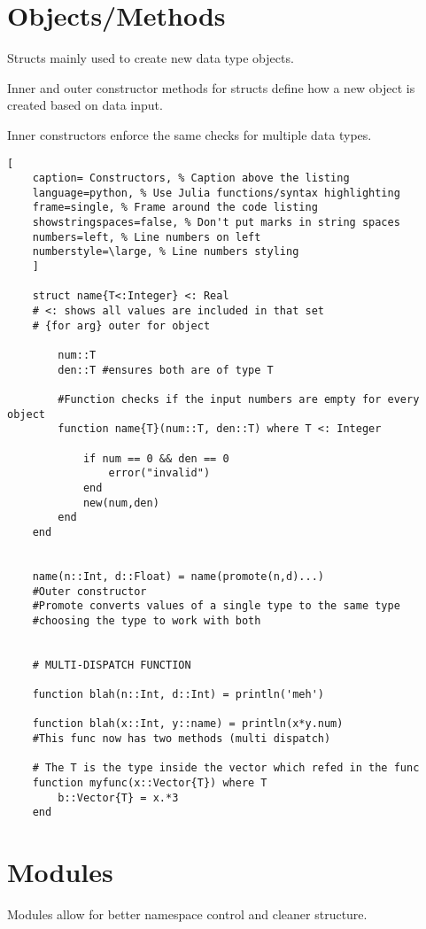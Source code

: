 \documentclass[11pt]{scrartcl} %
\begin{document}
\newpage
\section{Objects/Methods}

Structs mainly used to create new data type objects.

Inner and outer constructor methods for structs define how a new object is created based on data input.

Inner constructors enforce the same checks for multiple data types.

\begin{lstlisting}[
	caption= Constructors, % Caption above the listing
	language=python, % Use Julia functions/syntax highlighting
	frame=single, % Frame around the code listing
	showstringspaces=false, % Don't put marks in string spaces
	numbers=left, % Line numbers on left
	numberstyle=\large, % Line numbers styling
	]

	struct name{T<:Integer} <: Real 
	# <: shows all values are included in that set
	# {for arg} outer for object

		num::T
		den::T #ensures both are of type T

		#Function checks if the input numbers are empty for every object
		function name{T}(num::T, den::T) where T <: Integer

			if num == 0 && den == 0
				error("invalid")
			end
			new(num,den)
		end		
	end 
	

	name(n::Int, d::Float) = name(promote(n,d)...)
	#Outer constructor
	#Promote converts values of a single type to the same type 
	#choosing the type to work with both


	# MULTI-DISPATCH FUNCTION

	function blah(n::Int, d::Int) = println('meh')

	function blah(x::Int, y::name) = println(x*y.num)
	#This func now has two methods (multi dispatch)

	# The T is the type inside the vector which refed in the func
	function myfunc(x::Vector{T}) where T
		b::Vector{T} = x.*3
	end

\end{lstlisting}

\newpage
\section{Modules}

Modules allow for better namespace control and cleaner structure.\\
\end{document}
